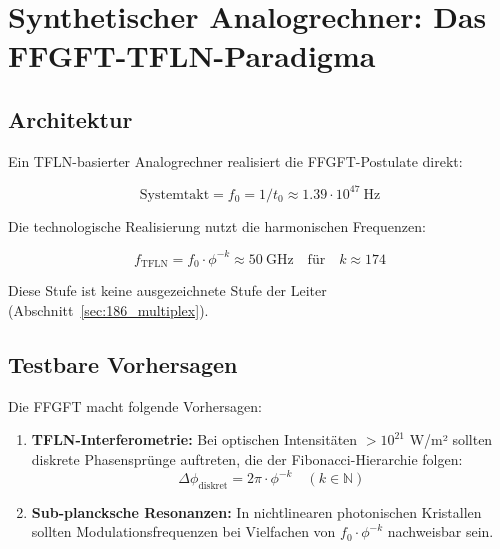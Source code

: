 	\begin{table}[h]
		\centering
		\caption{Vergleich sub-planckscher Modelle}
		{\footnotesize{}} %
	\end{table}
	
	\section{Synthetischer Analogrechner: Das FFGFT-TFLN-Paradigma}
	
	\subsection{Architektur}
	
	Ein TFLN-basierter Analogrechner realisiert die FFGFT-Postulate direkt:
	
	\begin{equation}
		\text{Systemtakt} = f_0 = 1/t_0 \approx 1.39 \cdot 10^{47}~\text{Hz}
	\end{equation}
	
	Die technologische Realisierung nutzt die harmonischen Frequenzen:
	
	\begin{equation}
		f_{\text{TFLN}} = f_0 \cdot \phi^{-k} \approx 50~\text{GHz} \quad \text{für} \quad k \approx 174
	\end{equation}
	
	Diese Stufe ist keine ausgezeichnete Stufe der Leiter (Abschnitt~\ref{sec:186_multiplex}).
	
	\subsection{Testbare Vorhersagen}
	
	Die FFGFT macht folgende Vorhersagen:
	
	\begin{enumerate}
		\item \textbf{TFLN-Interferometrie:} Bei optischen Intensitäten $>10^{21}$ W/m² sollten diskrete Phasensprünge auftreten, die der Fibonacci-Hierarchie folgen:
		\begin{equation}
			\Delta \phi_{\text{diskret}} = 2\pi \cdot \phi^{-k} \quad (k \in \mathbb{N})
		\end{equation}
		
		\item \textbf{Sub-plancksche Resonanzen:} In nichtlinearen photonischen Kristallen sollten Modulationsfrequenzen bei Vielfachen von $f_0 \cdot \phi^{-k}$ nachweisbar sein.
	\end{enumerate}
	
